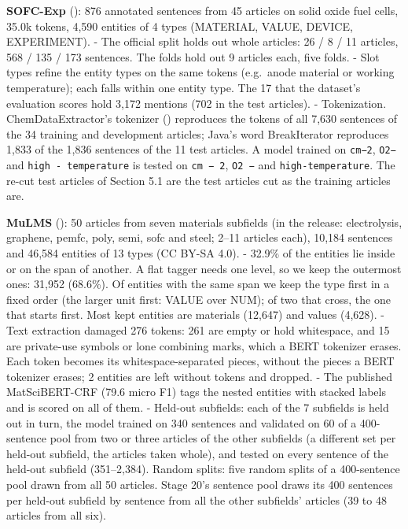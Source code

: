 \documentclass[11pt,a4paper]{article}
\begin{document}
\textbf{SOFC-Exp} (\citealp{friedrich2020sofc}): 876 annotated sentences from 45 articles
on solid oxide fuel cells, 35.0k tokens, 4,590 entities of 4 types
(MATERIAL, VALUE, DEVICE, EXPERIMENT).
- The official split holds out whole articles: 26 / 8 / 11 articles, 568 /
135 / 173 sentences. The folds hold out 9 articles each, five folds.
- Slot types refine the entity types on the same tokens (e.g.~anode
material or working temperature); each falls within one entity type. The
17 that the dataset's evaluation scores hold 3,172 mentions (702 in the
test articles).
- Tokenization. ChemDataExtractor's tokenizer (\citealp{swain2016chemdataextractor})
reproduces the tokens of all 7,630 sentences of the 34 training and
development articles; Java's word BreakIterator reproduces 1,833 of the
1,836 sentences of the 11 test articles. A model trained on \texttt{cm−2},
\texttt{O2−} and \texttt{high\ -\ temperature} is tested on \texttt{cm\ −\ 2}, \texttt{O2\ −} and
\texttt{high-temperature}. The re-cut test articles of Section 5.1 are the test
articles cut as the training articles are.

\textbf{MuLMS} (\citealp{schrader2023mulms}): 50 articles from seven materials subfields
(in the release: electrolysis, graphene, pemfc, poly, semi, sofc and
steel; 2--11 articles each), 10,184 sentences and 46,584 entities of 13
types (CC BY-SA 4.0).
- 32.9\% of the entities lie inside or on the span of another. A flat
tagger needs one level, so we keep the outermost ones: 31,952 (68.6\%).
Of entities with the same span we keep the type first in a fixed order
(the larger unit first: VALUE over NUM); of two that cross, the one that
starts first. Most kept entities are materials (12,647) and values
(4,628).
- Text extraction damaged 276 tokens: 261 are empty or hold whitespace,
and 15 are private-use symbols or lone combining marks, which a BERT
tokenizer erases. Each token becomes its whitespace-separated pieces,
without the pieces a BERT tokenizer erases; 2 entities are left without
tokens and dropped.
- The published MatSciBERT-CRF (79.6 micro F1) tags the nested entities
with stacked labels and is scored on all of them.
- Held-out subfields: each of the 7 subfields is held out in turn, the
model trained on 340 sentences and validated on 60 of a 400-sentence
pool from two or three articles of the other subfields (a different set
per held-out subfield, the articles taken whole), and tested on every
sentence of the held-out subfield (351--2,384). Random splits: five
random splits of a 400-sentence pool drawn from all 50 articles. Stage
20's sentence pool draws its 400 sentences per held-out subfield by
sentence from all the other subfields' articles (39 to 48 articles from
all six).
\end{document}
